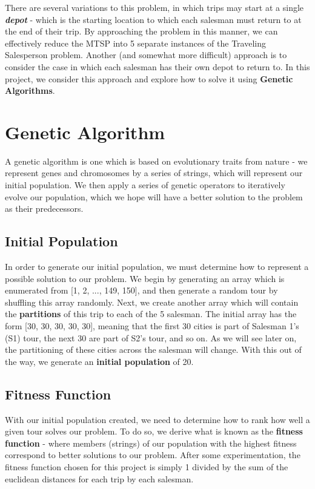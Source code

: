 \documentclass{article}
\begin{document}
There are several variations to this problem, in which trips may start at a single \textbf{\emph{depot}} - which is the starting location to which each salesman must return to at the end of their trip. By approaching the problem in this manner, we can effectively reduce the MTSP into 5 separate instances of the Traveling Salesperson problem. Another (and somewhat more difficult) approach is to consider the case in which each salesman has their own depot to return to. In this project, we consider this approach and explore how to solve it using \textbf{Genetic Algorithms}.

\section{Genetic Algorithm}

A genetic algorithm is one which is based on evolutionary traits from nature - we represent genes and chromosomes by a series of strings, which will represent our initial population. We then apply a series of genetic operators to iteratively evolve our population, which we hope will have a better solution to the problem as their predecessors.

\subsection{Initial Population}

In order to generate our initial population, we must determine how to represent a possible solution to our problem. We begin by generating an array which is enumerated from [1, 2, ..., 149, 150], and then generate a random tour by shuffling this array randomly. Next, we create another array which will contain the \textbf{partitions} of this trip to each of the 5 salesman. The initial array has the form [30, 30, 30, 30, 30],  meaning that the first 30 cities is part of Salesman 1's (S1) tour, the next 30 are part of S2's tour, and so on. As we will see later on, the partitioning of these cities across the salesman will change. With this out of the way, we generate an \textbf{initial population} of 20.

\subsection{Fitness Function}

With our initial population created, we need to determine how to rank how well a given tour solves our problem. To do so, we derive what is known as the \textbf{fitness function} - where members (strings) of our population with the highest fitness correspond to better solutions to our problem. After some experimentation, the fitness function chosen for this project is simply 1 divided by the sum of the euclidean distances for each trip by each salesman.
\end{document}
